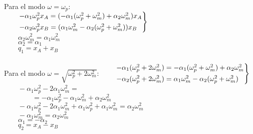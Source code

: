 \documentclass[a4paper,landscape,10pt]{cheatsheet}
\begin{document}
\hfill\\
Para el modo $\omega=\omega_p$:\\
$\qquad \begin{rcases}
    -\alpha_1\omega_p^2x_A=(-\alpha_1(\omega_p^2+\omega_m^2)+\alpha_2\omega_m^2)x_A \\
    -\alpha_2\omega_p^2x_B=(\alpha_1\omega_m^2-\alpha_2(\omega_p^2+\omega_m^2))x_B  \\
  \end{rcases}
$\\
$\qquad \alpha_2\omega_m^2=\alpha_1\omega_m^2$\\
$\qquad \alpha_2=\alpha_1$\\
$\qquad q_1=x_A+x_B$\\
\hfill\\
Para el modo $\omega=\sqrt{\omega_p^2+2\omega_m^2}$:
$\qquad \begin{rcases}
    -\alpha_1(\omega_p^2+2\omega_m^2)=-\alpha_1(\omega_p^2+\omega_m^2)+\alpha_2\omega_m^2 \\
    -\alpha_2(\omega_p^2+2\omega_m^2)=\alpha_1\omega_m^2-\alpha_2(\omega_p^2+\omega_m^2)  \\
  \end{rcases}
$\\
$\qquad -\alpha_1\omega_p^2-2\alpha_1\omega_m^2=$\\
$\qquad\qquad =-\alpha_1\omega_p^2-\alpha_1\omega_m^2+\alpha_2\omega_m^2$\\
$\qquad -\alpha_1\omega_p^2-2\alpha_1\omega_m^2+\alpha_1\omega_p^2+\alpha_1\omega_m^2=\alpha_2\omega_m^2$\\
$\qquad -\alpha_1\omega_m^2=\alpha_2\omega_m^2$\\
$\qquad \alpha_1=-\alpha_2$\\
$\qquad q_2=x_A-x_B$\\

\end{document}
